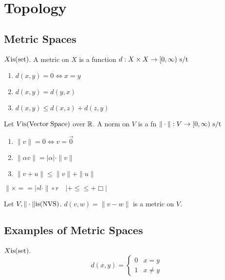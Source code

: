 \documentclass[12pt]{article}
\begin{document}
\section{Topology}
\subsection{Metric Spaces}

\bbox
\begin{defn}\label{defn:metric_space}
  \(X\mathrm{is}(\mathrm{set})\). A metric on \(X\) is a function
  \(d:X\times X\to[0,\infty)\text{ s/t }\)
  \begin{enumerate}
    \item \(d(x,y)=0\iff x=y\)
    \item {} \(d(x,y)=d(y,x)\)
    \item {} \(d(x,y)\le d(x,z)+d(z,y)\)
  \end{enumerate}
\end{defn}
\ebox


\bbox
\begin{defn}\label{defn:nvs}
  Let \(V\mathrm{is}(\mathrm{Vector\;Space})\) over \(\mathbb R\).
  A norm on \(V\) is a fn \(\|\cdot\|:V\to[0,\infty)\text{ s/t }\)
  \begin{enumerate}
    \item \(\|v\|=0\iff v=\vec 0\)
    \item \(\|\alpha v\|=|\alpha|\cdot\|v\|\)
    \item \(\|v+u\|\le\|v\|+\|u\|\)
  \end{enumerate}
\end{defn}
\ebox
\bboxex
{} \(\|\times==|\circ l\cdot\|\circ r\quad\)\(|+\le\le+\Box|\)
\ebox


\bbox
\begin{prop}\label{prop:nvs_have_trivial_metrics}
  Let \(V,\|\cdot\|\mathrm{is}(\mathrm{NVS})\). \(d(v,w)=\|v-w\|\) is a metric on \(V\).
\end{prop}
\ebox

\subsection{Examples of Metric Spaces}


\bboxex
\begin{exam}\label{exam:discrete_metric}
  \(X\mathrm{is}(\mathrm{set})\).
  \[
    d(x,y)=\begin{cases}
    0&x=y\\ 1&x\neq y\end{cases}
  \]
\end{exam}
\ebox
\end{document}
